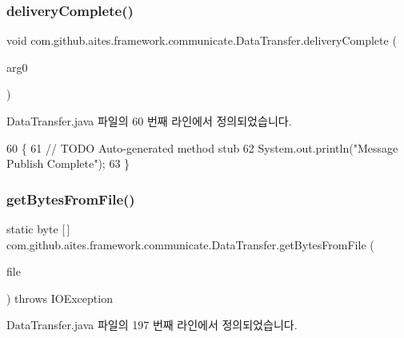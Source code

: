 \subsubsection{\texorpdfstring{delivery\+Complete()}{deliveryComplete()}}
{\footnotesize\ttfamily void com.\+github.\+aites.\+framework.\+communicate.\+Data\+Transfer.\+delivery\+Complete (\begin{DoxyParamCaption}\item[{I\+Mqtt\+Delivery\+Token}]{arg0 }\end{DoxyParamCaption})}



Data\+Transfer.\+java 파일의 60 번째 라인에서 정의되었습니다.


\begin{DoxyCode}
60                                                           \{
61         \textcolor{comment}{// TODO Auto-generated method stub}
62         System.out.println(\textcolor{stringliteral}{"Message Publish Complete"});
63     \}
\end{DoxyCode}
\mbox{\label{classcom_1_1github_1_1aites_1_1framework_1_1communicate_1_1_data_transfer_a8eb17deab26fac405a47ba24209f82ed}} 
\subsubsection{\texorpdfstring{get\+Bytes\+From\+File()}{getBytesFromFile()}}
{\footnotesize\ttfamily static byte \mbox{[}$\,$\mbox{]} com.\+github.\+aites.\+framework.\+communicate.\+Data\+Transfer.\+get\+Bytes\+From\+File (\begin{DoxyParamCaption}\item[{File}]{file }\end{DoxyParamCaption}) throws I\+O\+Exception\hspace{0.3cm}{\ttfamily [static]}}



Data\+Transfer.\+java 파일의 197 번째 라인에서 정의되었습니다.


